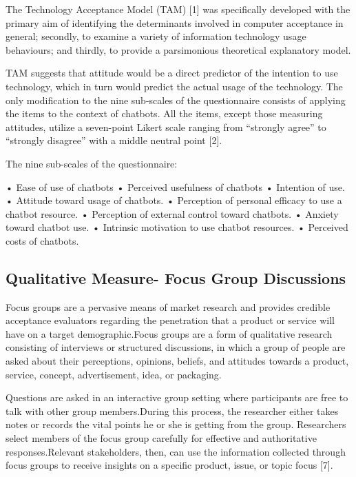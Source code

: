 \documentclass[a4paper, nobind]{templates/ociamthesis}
\begin{document}
The Technology Acceptance Model (TAM) {[}1{]} was specifically developed with the primary aim of identifying the determinants involved in computer acceptance in general; secondly, to examine a variety of information technology usage behaviours; and thirdly, to provide a parsimonious theoretical explanatory model.

TAM suggests that attitude would be a direct predictor of the intention to use technology, which in turn would predict the actual usage of the technology.
The only modification to the nine sub-scales of the questionnaire consists of applying the items to the context of chatbots.
All the items, except those measuring attitudes, utilize a seven-point Likert scale ranging from ``strongly agree'' to ``strongly disagree'' with a middle neutral point {[}2{]}.

The nine sub-scales of the questionnaire:

• Ease of use of chatbots
• Perceived usefulness of chatbots
• Intention of use.
• Attitude toward usage of chatbots.
• Perception of personal efficacy to use a chatbot resource.
• Perception of external control toward chatbots.
• Anxiety toward chatbot use.
• Intrinsic motivation to use chatbot resources.
• Perceived costs of chatbots.

\hypertarget{qualitative-measure--focus-group-discussions}{%
\subsection{Qualitative Measure- Focus Group Discussions}\label{qualitative-measure--focus-group-discussions}}

Focus groups are a pervasive means of market research and provides credible acceptance evaluators regarding the penetration that a product or service will have on a target demographic.Focus groups are a form of qualitative research consisting of interviews or structured discussions, in which a group of people are asked about their perceptions, opinions, beliefs, and attitudes towards a product, service, concept, advertisement, idea, or packaging.

Questions are asked in an interactive group setting where participants are free to talk with other group members.During this process, the researcher either takes notes or records the vital points he or she is getting from the group.
Researchers select members of the focus group carefully for effective and authoritative responses.Relevant stakeholders, then, can use the information collected through focus groups to receive insights on a specific product, issue, or topic focus {[}7{]}.
\end{document}
